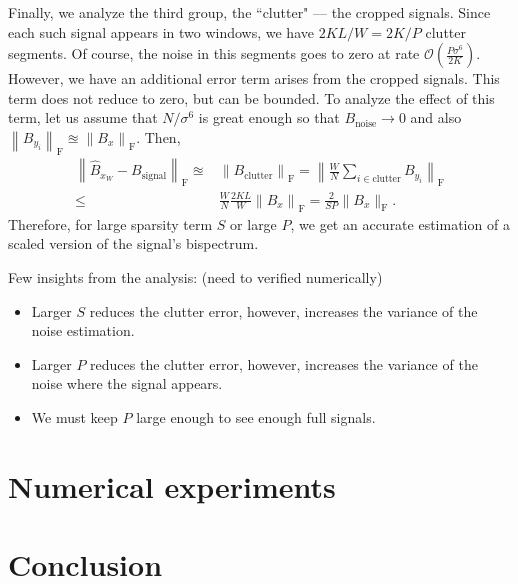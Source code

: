 \documentclass[journal]{IEEEtran}
\numberwithin{equation}{section}
\numberwithin{figure}{section}
\theoremstyle{plain}
\theoremstyle{definition}
\theoremstyle{remark}
\theoremstyle{plain}
\theoremstyle{remark}
\theoremstyle{plain}
\theoremstyle{plain}
\newcommand{\order}[1]{\mathcal{O}\left({#1} \right)}
\begin{document}
Finally, we analyze the third group, the  ``clutter" --- the cropped signals. Since each such signal appears in two windows,
we have $2KL/W = 2K/P$ clutter segments. Of course, the noise in this segments goes to zero
at rate $\order{\frac{P\sigma^6}{2K}}$. However, we have an additional error term arises from  the cropped signals. This term does not reduce to zero, but can be bounded. 
 To analyze the effect of this term, let us assume that $N/\sigma^6$ is great enough so that $B_\textrm{noise}\to 0$ and also $\left\|B_{y_i}\right\|_{\textrm{F}} \approxeq \left\|B_x\right\|_{\textrm{F}}$. Then,
\begin{equation}
\begin{split}
\left\| \hat{B}_{x_W} - B_\textrm{signal}\right\|_{\textrm{F}} \approxeq&  \left\|B_\textrm{clutter}\right\|_{\textrm{F}}
= \left\|\frac{W}{N}\sum_{i\in\textrm{clutter}}B_{y_i}\right\|_{\textrm{F}}
\\ \leq & 
\frac{W}{N}\frac{2KL}{W}\left\|B_x\right\|_{\textrm{F}} = \frac{2}{SP}
\|B_x\|_{\textrm{F}}.
\end{split}
\end{equation}
Therefore, for large sparsity term $S$ or large $P$, we get an accurate estimation of a scaled version of the signal's bispectrum. 

Few insights from the analysis: (need to verified numerically)
\begin{itemize}
	\item Larger $S$ reduces the clutter error, however, increases the variance of the noise estimation.
	\item Larger $P$ reduces the clutter error, however, increases the variance of the noise  where the signal appears.
	\item We must keep $P$ large enough to see enough full signals.    
\end{itemize} 


\section{Numerical experiments} \label{sec:experiments}

\section{Conclusion} \label{sec:conclusion}






\end{document}
